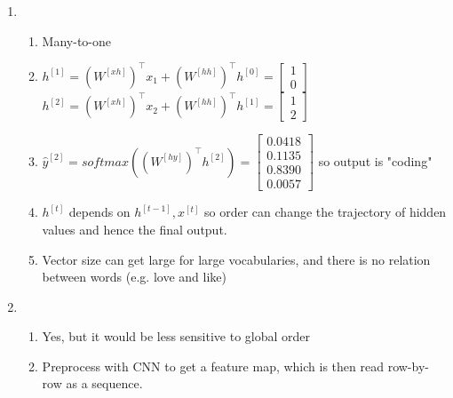 \documentclass[12pt, a4paper]{article}
\begin{document}
\begin{enumerate}[\Alph*.]
  \item 
    \begin{enumerate}[\arabic*.]
      \item Many-to-one

      \item $h^{[1]} = (W^{[xh]})^\top x_1 + (W^{[hh]})^\top h^{[0]} = \begin{bmatrix}1\\0\end{bmatrix}$\\
        $h^{[2]} = (W^{[xh]})^\top x_2 + (W^{[hh]})^\top h^{[1]} = \begin{bmatrix}1\\2\end{bmatrix}$ 

      \item $\hat{y}^{[2]} = softmax((W^{[hy]})^\top h^{[2]}) = \begin{bmatrix}0.0418\\0.1135\\0.8390\\0.0057\end{bmatrix}$ so output is "coding"

      \item $h^{[t]}$ depends on $h^{[t-1]}, x^{[t]}$ so order can change the trajectory of hidden values and hence the final output. 

      \item Vector size can get large for large vocabularies, and there is no relation between words (e.g. love and like)
    \end{enumerate}

  \item 
    \begin{enumerate}[\arabic*.]
      \item Yes, but it would be less sensitive to global order 
      
      \item Preprocess with CNN to get a feature map, which is then read row-by-row as a sequence. 
    \end{enumerate}
\end{enumerate}
\end{document}
